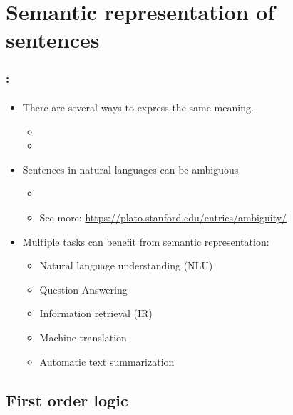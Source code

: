 \documentclass[xcolor=table]{beamer}
\begin{document}
\section{Semantic representation of sentences}

\begin{frame}
	\frametitle{\insertshortsubtitle: \insertsection}
	\framesubtitle{\insertsubsection}
	
	\begin{itemize}
		\item There are several ways to express the same meaning.
		\begin{itemize}
			\item {}
			\item {}
		\end{itemize}
	
		\item Sentences in natural languages can be ambiguous
		\begin{itemize}
			\item {}
			\item See more: \url{https://plato.stanford.edu/entries/ambiguity/}
		\end{itemize}
	
		\item Multiple tasks can benefit from semantic representation:
		\begin{itemize}
			\item Natural language understanding (NLU)
			\item Question-Answering
			\item Information retrieval (IR)
			\item Machine translation
			\item Automatic text summarization
		\end{itemize}
	\end{itemize}
	
\end{frame}

\subsection{First order logic}
\end{document}

